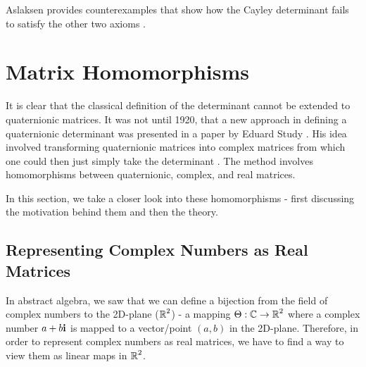  Aslaksen provides counterexamples that show how the Cayley determinant fails to satisfy the other two axioms \cite{aslaksen}.

\section{Matrix Homomorphisms}

 It is clear that the classical definition of the determinant cannot be extended to quaternionic matrices. It was not until 1920, that a new approach in defining a quaternionic determinant was presented in a paper by Eduard Study \cite{aslaksen}. His idea involved transforming quaternionic matrices into complex matrices from which one could then just simply take the determinant \cite{aslaksen}. The method involves homomorphisms between quaternionic, complex, and real matrices. 

 In this section, we take a closer look into these homomorphisms - first discussing the motivation behind them and then the theory. 

\subsection{Representing Complex Numbers as Real Matrices}

In abstract algebra, we saw that we can define a bijection from the field of complex numbers to the 2D-plane ($\operatorname{\mathbb{R}}^2$) - a mapping $\Theta : \operatorname{\mathbb{C}} \rightarrow \operatorname{\mathbb{R}}^2$ where a complex number $a+b\textbf{i}$ is mapped to a vector/point $(a,b)$ in the 2D-plane. Therefore, in order to represent complex numbers as real matrices, we have to find a way to view them as linear maps in $\operatorname{\mathbb{R}}^2$. 

